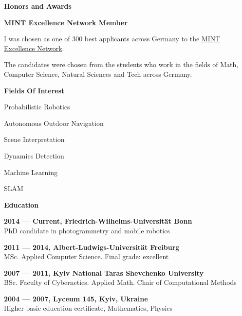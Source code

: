 \documentclass[a4paper,12pt,final]{memoir}
\newcommand{\SmallSep}{\vspace{0.5em}}
\newcommand{\CVSection}[1]
	{\Large\textbf{#1}\par
	\SmallSep\normalsize\normalfont}
\newcommand{\CVItem}[1]
	{\textbf{\color{MidnightBlue} #1}}
\begin{document}
	\CVSection{Honors and Awards}
	\CVItem{MINT Excellence Network Member}
	\begin{compactitem}[\color{MidnightBlue}$\circ$]
		\item I was chosen as one of 300 best applicants across Germany to the
		\href{http://www.mlp.de/#/studenten/karriere/stipendienprogramme/mint-excellence}
		{MINT Excellence Network}.

		The candidates were chosen from the students who work in the fields of Math,
		Computer Science, Natural Sciences and Tech across Germany.
	\end{compactitem}
	\SmallSep{}

	\CVSection{Fields Of Interest}
	\begin{compactitem}[\color{MidnightBlue}$\circ$]
		\item Probabilistic Robotics
		\item Autonomous Outdoor Navigation
		\item Scene Interpretation
		\item Dynamics Detection
		\item Machine Learning
		\item SLAM
	\end{compactitem}
	\SmallSep

\vfill
\framebreak{}

\CVSection{Education}
\CVItem{2014 --- Current, Friedrich-Wilhelms-Universit\"at Bonn}\\
PhD candidate in photogrammetry and mobile robotics
\SmallSep{}

\CVItem{2011 --- 2014, Albert-Ludwigs-Universit\"at Freiburg}\\
MSc. Applied Computer Science. Final grade: excellent
\SmallSep{}

\CVItem{2007 --- 2011, Kyiv National Taras Shevchenko University}\\
BSc. Faculty of Cybernetics. Applied Math.
\newline Chair of Computational Methods
\SmallSep{}

\CVItem{2004 --- 2007, Lyceum 145, Kyiv, Ukraine}\\
Higher basic education certificate, Mathematics, Physics
\SmallSep{}
\end{document}
